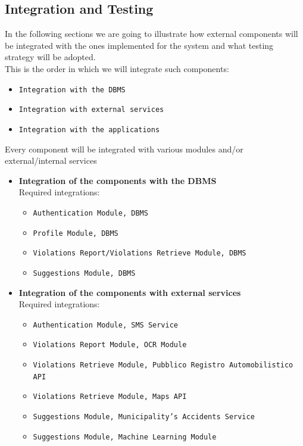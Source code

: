\documentclass[12pt,a4paper]{article}
\begin{document}
\subsection{Integration and Testing}
In the following sections we are going to illustrate how external components will be integrated with the ones implemented for the system and what testing strategy will be adopted.\\

This is the order in which we will integrate such components:
\begin{itemize}
\item \texttt{Integration with the DBMS}
\item \texttt{Integration with external services}
\item \texttt{Integration with the applications}
\end{itemize}
Every component will be integrated with various modules and/or external/internal services
\begin{itemize}
\item \textbf{Integration of the components with the DBMS}\\
Required integrations:
\begin{itemize}
\item \texttt{Authentication Module, DBMS}
\item \texttt{Profile Module, DBMS}
\item \texttt{Violations Report/Violations Retrieve Module, DBMS}
\item \texttt{Suggestions Module, DBMS}
\end{itemize}
\end{itemize}

\begin{itemize}
\item \textbf{Integration of the components with external services}\\
Required integrations:
\begin{itemize}
\item \texttt{Authentication Module, SMS Service}
\item \texttt{Violations Report Module, OCR Module}
\item \texttt{Violations Retrieve Module, Pubblico Registro Automobilistico API}
\item \texttt{Violations Retrieve Module, Maps API}
\item \texttt{Suggestions Module, Municipality's Accidents Service}
\item \texttt{Suggestions Module, Machine Learning Module}
\end{itemize}
\end{itemize}
\end{document}
